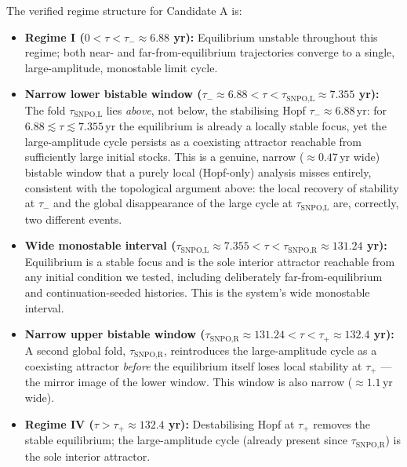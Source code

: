 \documentclass[twocolumn,10pt]{article}
\begin{document}
The verified regime structure for Candidate A is:
\begin{itemize}
    \item \textbf{Regime I (\(0 < \tau < \tau_{-} \approx 6.88\) yr):} Equilibrium unstable throughout this regime; both near- and far-from-equilibrium trajectories converge to a single, large-amplitude, monostable limit cycle.
    \item \textbf{Narrow lower bistable window (\(\tau_{-} \approx 6.88 < \tau < \tau_{\text{SNPO,L}} \approx 7.355\) yr):} The fold $\tau_{\text{SNPO,L}}$ lies \emph{above}, not below, the stabilising Hopf $\tau_-\approx6.88$\,yr: for $6.88\lesssim\tau\lesssim7.355$\,yr the equilibrium is already a locally stable focus, yet the large-amplitude cycle persists as a coexisting attractor reachable from sufficiently large initial stocks. This is a genuine, narrow ($\approx0.47$\,yr wide) bistable window that a purely local (Hopf-only) analysis misses entirely, consistent with the topological argument above: the local recovery of stability at $\tau_-$ and the global disappearance of the large cycle at $\tau_{\text{SNPO,L}}$ are, correctly, two different events.
    \item \textbf{Wide monostable interval (\(\tau_{\text{SNPO,L}}\approx7.355 < \tau < \tau_{\text{SNPO,R}}\approx131.24\) yr):} Equilibrium is a stable focus and is the sole interior attractor reachable from any initial condition we tested, including deliberately far-from-equilibrium and continuation-seeded histories. This is the system's wide monostable interval.
    \item \textbf{Narrow upper bistable window (\(\tau_{\text{SNPO,R}} \approx 131.24 < \tau < \tau_{+} \approx 132.4\) yr):} A second global fold, $\tau_{\text{SNPO,R}}$, reintroduces the large-amplitude cycle as a coexisting attractor \emph{before} the equilibrium itself loses local stability at $\tau_+$ — the mirror image of the lower window. This window is also narrow ($\approx1.1$\,yr wide).
    \item \textbf{Regime IV (\(\tau > \tau_{+} \approx 132.4\) yr):} Destabilising Hopf at $\tau_+$ removes the stable equilibrium; the large-amplitude cycle (already present since $\tau_{\text{SNPO,R}}$) is the sole interior attractor.
\end{itemize}
\end{document}
